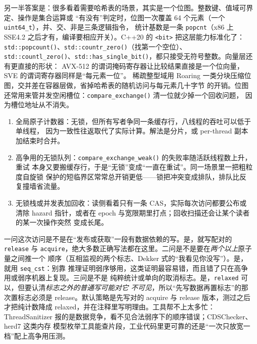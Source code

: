 \documentclass[12pt,a4paper,fontset=fandol]{ctexbook}
\newcommand{\cpp}[1]{C++#1}
\newcommand{\Fn}[1]{\texttt{#1()}}
\newcommand{\Tp}[1]{\texttt{#1}}
\begin{document}
另一半答案是：很多看着需要哈希表的场景，其实是一个位图。整数键、值域可界定、操作是集合运算或
``有没有''判定时，位图一次覆盖 64 个元素（一个 \Tp{uint64\_t}），并、交、非是三条逻辑指令，
统计基数是一条 \Tp{popcnt}（x86 上 SSE4.2 之后才有，编译要相应开关）。\cpp{20} 的 \Tp{<bit>}
把这层能力标准化了：\Fn{std::popcount}、\Fn{std::countr\_zero}（找第一个空位）、
\Fn{std::countl\_zero}、\Fn{std::has\_single\_bit}，都只接受无符号整数。向量层还有更直接的形状：
AVX-512 的谓词掩码寄存器让比较结果直接是一个位向量，SVE 的谓词寄存器同样是``每元素一位''。
稀疏整型域用 Roaring 一类分块压缩位图，交并差在容器层做，省掉哈希表的随机访问与每元素几十字节
的开销。位图还常用来管并发空闲槽位：\Fn{compare\_exchange} 清一位就少掉一个回收问题，
因为槽位地址从不消失。

\begin{warning}[title={``无锁就是快''的三个反例}]
\begin{enumerate}
  \item 全局原子计数器：无锁，但所有写者争同一条缓存行，八线程的吞吐可以低于单线程，
        因为一致性往返取代了实际计算。解法是分片，或 per-thread 副本加结束时合并。
  \item 高争用的无锁队列：\Fn{compare\_exchange\_weak} 的失败率随活跃线程数上升，重试
        本身又要搬缓存行，于是``无锁''变成``一直在重试''。同一场景里一把粗粒度自旋锁
        保护的短临界区常常总开销更低——锁把冲突变成排队，排队比反复撞墙省流量。
  \item 无锁栈或并发表加回收：读侧看着只有一条 CAS，实际每次访问都要公布或清除 hazard
        指针，或者在 epoch 与宽限期里打点；回收扫描还会让某个读者的某一次操作突然
        变成长尾。
\end{enumerate}
\end{warning}

\begin{note}[title={内存序怎么选：三问加一条默认}]
一问这次访问是不是在``发布或获取''一段有数据依赖的写。是，就写配对的 \Tp{release} 与
\Tp{acquire}，绝大多数正确写法都在这里。二问是不是要在\emph{两个以上}原子量之间推一个
顺序（互相监视的两个标志、Dekker 式的``我看见你没写''）。是，就用 \Tp{seq\_cst}：别靠
推理证明弱序够用，这类证明最容易错，而且错了只在高争用或弱序机器上复现。三问是不是
纯粹统计或单向的取消标志。是，\Tp{relaxed} 可以，但要认清\emph{标志之外的普通写可能对它
不可见}，所以``先写数据再置标志''的那次置标志必须是 release。默认策略是先写对的 acquire
与 release 版本，测过之后才把纯计数降成 relaxed，并在注释里写明理由。工具帮不上太多忙：
ThreadSanitizer 报的是数据竞争，看不见合法弱序下的顺序错误；CDSChecker、herd7 这类内存
模型枚举工具能查片段，工业代码里更可靠的还是``一次只放宽一档''配上高争用压测。
\end{note}
\end{document}
